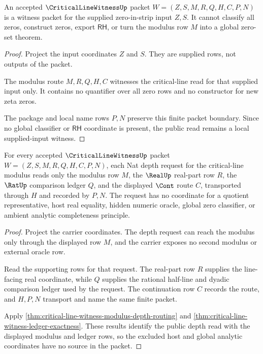 \begin{theorem}
\label{thm:critical-line-witness-rh-nonclassification-boundary}
An accepted $\CriticalLineWitnessUp$ packet $W=(Z,S,M,R,Q,H,C,P,N)$ is a witness packet for the supplied zero-in-strip input $Z,S$. It cannot classify all zeros, construct zeros, export $\mathsf{RH}$, or turn the modulus row $M$ into a global zero-set theorem.
\end{theorem}
\begin{proof}
Project the input coordinates $Z$ and $S$. They are supplied rows, not outputs of the packet.

The modulus route $M,R,Q,H,C$ witnesses the critical-line read for that supplied input only. It contains no quantifier over all zero rows and no constructor for new zeta zeros.

The package and local name rows $P,N$ preserve this finite packet boundary. Since no global classifier or $\mathsf{RH}$ coordinate is present, the public read remains a local supplied-input witness.
\end{proof}

\begin{theorem}
\label{thm:critical-line-witness-depth-request-ledger}
For every accepted $\CriticalLineWitnessUp$ packet $W=(Z,S,M,R,Q,H,C,P,N)$,
each Nat depth request for the critical-line modulus reads only the modulus
row $M$, the $\RealUp$ real-part row $R$, the $\RatUp$ comparison ledger $Q$,
and the displayed $\Cont$ route $C$, transported through $H$ and recorded by
$P,N$. The request has no coordinate for a quotient representative, host real
equality, hidden numeric oracle, global zero classifier, or ambient analytic
completeness principle.
\end{theorem}
\begin{proof}
Project the carrier coordinates. The depth request can reach the modulus only
through the displayed row $M$, and the carrier exposes no second modulus or
external oracle row.

Read the supporting rows for that request. The real-part row $R$ supplies the
line-facing real coordinate, while $Q$ supplies the rational half-line and
dyadic comparison ledger used by the request. The continuation row $C$
records the route, and $H,P,N$ transport and name the same finite packet.

Apply \autoref{thm:critical-line-witness-modulus-depth-routing} and
\autoref{thm:critical-line-witness-ledger-exactness}. These results identify
the public depth read with the displayed modulus and ledger rows, so the
excluded host and global analytic coordinates have no source in the packet.
\end{proof}

